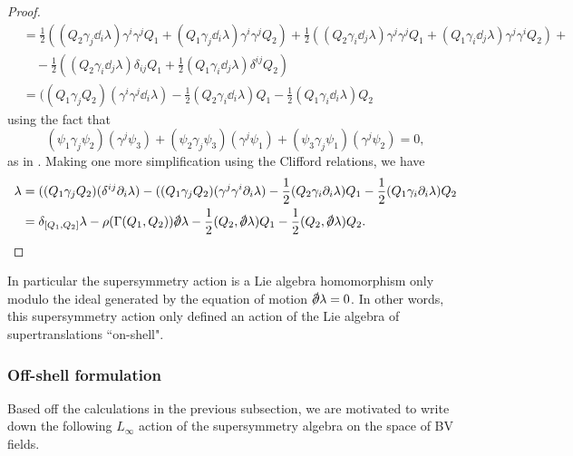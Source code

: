 \documentclass[10pt, oneside]{article}
\begin{document}
\begin{proof}
\begin{align*}
&= \frac 12((Q_2 \gamma_j \dd_i \lambda) \gamma^i \gamma^j Q_1 + (Q_1 \gamma_j \dd_i \lambda) \gamma^i \gamma^j Q_2) + \frac 12((Q_2 \gamma_i \dd_j \lambda) \gamma^j \gamma^j Q_1 + (Q_1 \gamma_i \dd_j \lambda) \gamma^j \gamma^i Q_2) + \\
&\quad - \frac 12((Q_2 \gamma_i \dd_j \lambda) \delta_{ij} Q_1 + \frac 12(Q_1 \gamma_i \dd_j \lambda) \delta^{ij} Q_2) \\
&= ((Q_1 \gamma_j Q_2) (\gamma^i \gamma^j \dd_i \lambda) - \frac 12(Q_2 \gamma_i \dd_i \lambda)Q_1 - \frac 12(Q_1 \gamma_i \dd_i \lambda)Q_2
\end{align*}
using the fact that 
\[(\psi_1 \gamma_j \psi_2)(\gamma^j \psi_3) + (\psi_2 \gamma_j \psi_3)(\gamma^j \psi_1) + (\psi_3 \gamma_j \psi_1)(\gamma^j \psi_2) = 0,\]
as in \cite[Theorem 11]{BaezHuerta}.  Making one more simplification using the Clifford relations, we have
\begin{align*}
[\delta_{Q_1}, \delta_{Q_2}] \lambda &= ((Q_1 \gamma_j Q_2) (\delta^{ij} \dd_i \lambda) - ((Q_1 \gamma_j Q_2) (\gamma^j \gamma^i \dd_i \lambda) - \frac 12(Q_2 \gamma_i \dd_i \lambda)Q_1 - \frac 12(Q_1 \gamma_i \dd_i \lambda)Q_2 \\
&= \delta_{[Q_1,Q_2]} \lambda - \rho(\Gamma(Q_1,Q_2)) \sd \dd \lambda - \frac 12(Q_2, \sd \dd \lambda)Q_1 - \frac 12(Q_2, \sd \dd \lambda)Q_2.
\end{align*}
\end{proof}

In particular the supersymmetry action is a Lie algebra homomorphism only modulo the ideal generated by the equation of motion $\sd \dd \lambda = 0$.
In other words, this supersymmetry action only defined an action of the Lie algebra of supertranslations ``on-shell". 

\subsubsection{Off-shell formulation}

Based off the calculations in the previous subsection, we are motivated to write down the following $L_\infty$ action of the supersymmetry algebra on the space of BV fields.
\end{document}

